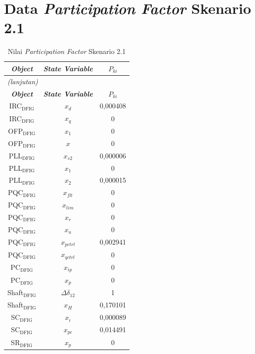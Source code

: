 \section{Data \textit{Participation Factor} Skenario 2.1}
\begingroup
\fontsize{12}{14.4}\selectfont
\setlength{\tabcolsep}{8pt}
\begin{longtable}{c c c} \caption[]{Nilai
	\textit{Participation Factor} Skenario 2.1} \label{tab:prf_sk21_lampiran} \\
	\toprule
	\multicolumn{1}{c}{\textbf{\textit{Object}}} & \textbf{\textit{State
	Variable}} & \textbf{$P_{ki}$} \\
	\midrule
	\endfirsthead
	\multicolumn{3}{l}{\textit{(lanjutan)}} \\
	\toprule
	\multicolumn{1}{c}{\textbf{\textit{Object}}} & \textbf{\textit{State
	Variable}} & \textbf{$P_{ki}$} \\
	\midrule
	\endhead
	\bottomrule
	\endfoot
	IRC$_\text{DFIG}$ & $x_d$ & 0,000408 \\
	IRC$_\text{DFIG}$ & $x_q$ & 0        \\
	OFP$_\text{DFIG}$ & $x_1$ & 0        \\
	OFP$_\text{DFIG}$ & $x$ & 0        \\
	PLL$_\text{DFIG}$ & $x_{s2}$ & 0,000006 \\
	PLL$_\text{DFIG}$ & $x_1$ & 0        \\
	PLL$_\text{DFIG}$ & $x_2$ & 0,000015 \\
	PQC$_\text{DFIG}$ & $x_{flt}$ & 0        \\
	PQC$_\text{DFIG}$ & $x_{lim}$ & 0        \\
	PQC$_\text{DFIG}$ & $x_r$ & 0        \\
	PQC$_\text{DFIG}$ & $x_u$ & 0        \\
	PQC$_\text{DFIG}$ & $x_{pctrl}$ & 0,002941 \\
	PQC$_\text{DFIG}$ & $x_{qctrl}$ & 0        \\
	PC$_\text{DFIG}$ & $x_{ip}$ & 0        \\
	PC$_\text{DFIG}$ & $x_p$ & 0        \\
	Shaft$_\text{DFIG}$ & $\Delta\delta_{12}$ & 1        \\
	Shaft$_\text{DFIG}$ & $x_H$ & 0,170101 \\
	SC$_\text{DFIG}$ & $x_i$ & 0,000089 \\
	SC$_\text{DFIG}$ & $x_{pc}$ & 0,014491 \\
	SR$_\text{DFIG}$ & $x_p$ & 0        \\

\end{longtable}
